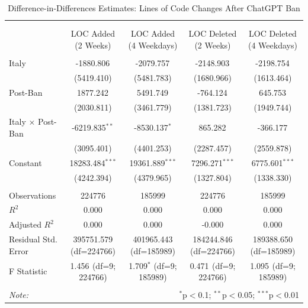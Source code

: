 \begin{table}[!htbp] \centering
  \caption{Difference-in-Differences Estimates: Lines of Code Changes After ChatGPT Ban}
\begin{tabular}{@{\extracolsep{5pt}}lcccc}
\\[-1.8ex]\hline
\hline \\[-1.8ex]
\\[-1.8ex] & \multicolumn{1}{c}{LOC Added (2 Weeks)} & \multicolumn{1}{c}{LOC Added (4 Weekdays)} & \multicolumn{1}{c}{LOC Deleted (2 Weeks)} & \multicolumn{1}{c}{LOC Deleted (4 Weekdays)}  \\
\hline \\[-1.8ex]
 Italy & -1880.806$^{}$ & -2079.757$^{}$ & -2148.903$^{}$ & -2198.754$^{}$ \\
& (5419.410) & (5481.783) & (1680.966) & (1613.464) \\
 Post-Ban & 1877.242$^{}$ & 5491.749$^{}$ & -764.124$^{}$ & 645.753$^{}$ \\
& (2030.811) & (3461.779) & (1381.723) & (1949.744) \\
 Italy × Post-Ban & -6219.835$^{**}$ & -8530.137$^{*}$ & 865.282$^{}$ & -366.177$^{}$ \\
& (3095.401) & (4401.253) & (2287.457) & (2559.878) \\
 Constant & 18283.484$^{***}$ & 19361.889$^{***}$ & 7296.271$^{***}$ & 6775.601$^{***}$ \\
& (4242.394) & (4379.965) & (1327.804) & (1338.330) \\
\hline \\[-1.8ex]
 Observations & 224776 & 185999 & 224776 & 185999 \\
 $R^2$ & 0.000 & 0.000 & 0.000 & 0.000 \\
 Adjusted $R^2$ & 0.000 & 0.000 & -0.000 & 0.000 \\
 Residual Std. Error & 395751.579 (df=224766) & 401965.443 (df=185989) & 184244.846 (df=224766) & 189388.650 (df=185989) \\
 F Statistic & 1.456$^{}$ (df=9; 224766) & 1.709$^{*}$ (df=9; 185989) & 0.471$^{}$ (df=9; 224766) & 1.095$^{}$ (df=9; 185989) \\
\hline
\hline \\[-1.8ex]
\textit{Note:} & \multicolumn{4}{r}{$^{*}$p$<$0.1; $^{**}$p$<$0.05; $^{***}$p$<$0.01} \\
\end{tabular}
\end{table}